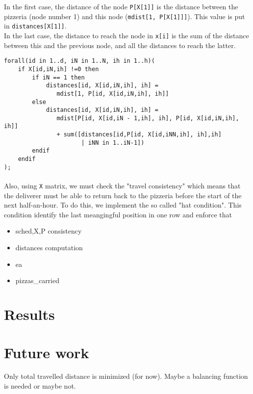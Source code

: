 \documentclass[10pt]{article}
\begin{document}
	In the first case, the distance of the node \texttt{P[X[1]]} is the 
	distance between the pizzeria (node number 1) and this node (\texttt{mdist[1, P[X[1]]]}). This value is put in \texttt{distances[X[1]]}.\\
	In the last case, the distance to reach the node in \texttt{x[i]} is 
	the sum of the distance between this and the previous node, and all 
	the distances to reach the latter. 
	\begin{verbatim}
forall(id in 1..d, iN in 1..N, ih in 1..h)(
    if X[id,iN,ih] !=0 then
        if iN == 1 then
      	    distances[id, X[id,iN,ih], ih] = 
               mdist[1, P[id, X[id,iN,ih], ih]] 
        else
      	    distances[id, X[id,iN,ih], ih] = 
         	   mdist[P[id, X[id,iN - 1,ih], ih], P[id, X[id,iN,ih], ih]] 
         	   + sum([distances[id,P[id, X[id,iNN,ih], ih],ih]
                      | iNN in 1..iN-1])
        endif
    endif
);
	\end{verbatim}

	\paragraph*{}
	Also, using \texttt{X} matrix, we must check the "travel consistency" which 
	means that the deliverer must be able to return back to the pizzeria before the start of the next half-an-hour. 
	To do this, we implement the so called "hat condition". This condition 
	identify the last meangingful position in one row and enforce that 
	\vspace{5em}

	\begin{itemize}
		\item sched,X,P consistency
		\item distances computation
		\item ea
		\item pizzas\_carried
	\end{itemize}


	\section{Results}
	\label{Results}



	\section{Future work}
	\label{Future work}
	Only total travelled distance is minimized (for now). Maybe a balancing 
	function is needed or maybe not.
\end{document}
